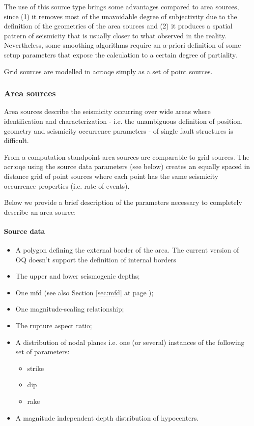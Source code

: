 The use of this source type brings some advantages compared to area sources, 
since (1) it removes most of the unavoidable degree of subjectivity due to 
the definition of the geometries of the area sources and (2) it produces
a spatial pattern of seismicity that is usually closer to what observed in 
the reality. 
Nevertheless, some smoothing algorithms require an a-priori definition of 
some setup parameters that expose the calculation to a certain degree of 
partiality.

Grid sources are modelled in \gls{acr:oqe} simply as a set of point sources. 
\subsubsection{Area sources}
\label{hazard:seismic_source_types:areaSources}
%
Area sources describe the seismicity occurring over wide areas where  
identification and characterization - i.e. the unambiguous definition 
of position, geometry and seismicity occurrence parameters - of single 
fault structures is difficult. 

From a computation standpoint area sources are comparable to grid sources.
The \gls{acr:oqe} using the source data parameters (see below)  
creates an equally spaced in distance grid of point sources where
each point has the same seismicity occurrence properties (i.e. rate
of events).

Below we provide a brief description of the parameters necessary to 
completely describe an area source:
%
\paragraph{Source data}
\begin{itemize}
\item A polygon defining the external border of the area. 
The current version of OQ doesn't support the definition 
of internal borders
\item The upper and lower seismogenic depths;
\item One \gls{mfd} (see also Section \ref{sec:mfd} at page 
    \pageref{sec:mfd});
\item One magnitude-scaling relationship;
\item The rupture aspect ratio;
\item A distribution of nodal planes i.e. one (or several) instances 
    of the following set of parameters:
\begin{itemize}
	\item strike
	\item dip
	\item rake
\end{itemize}
\item A magnitude independent depth distribution of hypocenters. 
\end{itemize}

